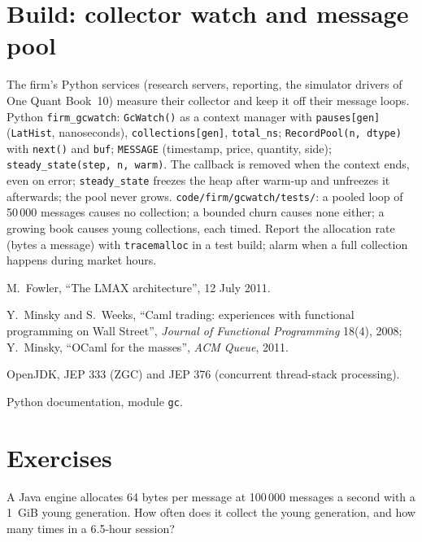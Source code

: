 \section{Build: collector watch and message pool}\label{bld:ll:managed-and-functional-languages-on-the-desk:gcwatch}

\begin{build}
 The firm's Python services (research servers, reporting, the simulator drivers of One Quant Book~10)
measure their collector and keep it off their message loops.
 Python \texttt{firm\_gcwatch}: \texttt{GcWatch()} as a context manager with \texttt{pauses[gen]}
(\texttt{LatHist}, nanoseconds), \texttt{collections[gen]}, \texttt{total\_ns}; \texttt{RecordPool(n, dtype)} with
\texttt{next()} and \texttt{buf}; \texttt{MESSAGE} (timestamp, price, quantity, side); \texttt{steady\_state(step, n,
warm)}.
 The callback is removed when the context ends, even on error; \texttt{steady\_state} freezes the heap after
warm-up and unfreezes it afterwards; the pool never grows.
 \texttt{code/firm/gcwatch/tests/}: a pooled loop of 50\,000 messages causes no collection; a
bounded churn causes none either; a growing book causes young collections, each timed.
 Report the allocation rate (bytes a message) with \texttt{tracemalloc} in a test build; alarm when a
full collection happens during market hours.
\end{build}

\begin{omsources}
\item M.~Fowler, ``The LMAX architecture'', 12 July 2011.
\item Y.~Minsky and S.~Weeks, ``Caml trading: experiences with functional programming on Wall Street'', \emph{Journal of
Functional Programming} 18(4), 2008; Y.~Minsky, ``OCaml for the masses'', \emph{ACM Queue}, 2011.
\item OpenJDK, JEP 333 (ZGC) and JEP 376 (concurrent thread-stack processing).
\item Python documentation, module \texttt{gc}.
\end{omsources}

\section{Exercises}

\begin{exercise}[$\star$]\label{exo:ll:managed-and-functional-languages-on-the-desk:1}
A Java engine allocates 64 bytes per message at 100\,000 messages a second with a 1~GiB young generation. How often does it
collect the young generation, and how many times in a 6.5-hour session?
\end{exercise}


